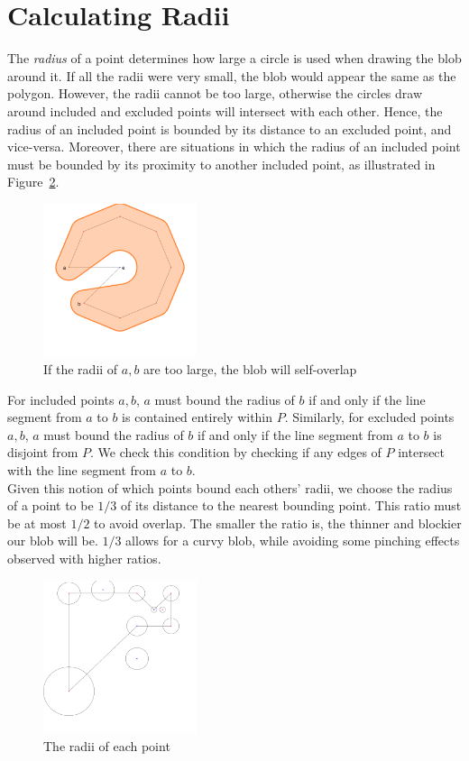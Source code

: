 \documentclass[paper=a4, fontsize=11pt]{scrartcl} %
\numberwithin{equation}{section} %
\numberwithin{figure}{section} %
\numberwithin{table}{section} %
\begin{document}
\section{Calculating Radii}
The \textit{radius} of a point determines how large a circle is used when
drawing the blob around it. If all the radii were very small, the blob would
appear the same as the polygon.  However, the radii cannot be too large,
otherwise the circles draw around included and excluded points will intersect
with each other. Hence, the radius of an included point is bounded by its
distance to an excluded point, and vice-versa. Moreover, there are situations in
which the radius of an included point must be bounded by its proximity to
another included point, as illustrated in Figure~\ref{fig:neck}. \\

\begin{figure}[h]
\includegraphics[width=0.4\textwidth]{torus_bitten}
\centering
\caption{If the radii of $a,b$ are too large, the blob will self-overlap}
\label{fig:neck}
\end{figure}

For included points $a,b$, $a$ must bound the radius of $b$ if and only if the
line segment from $a$ to $b$ is contained entirely within $P$. Similarly, for
excluded points $a,b$, $a$ must bound the radius of $b$ if and only if the line
segment from $a$ to $b$ is disjoint from $P$. We check this condition by
checking if any edges of $P$ intersect with the line segment from $a$ to $b$. \\

Given this notion of which points bound each others' radii, we choose the radius
of a point to be $1/3$ of its distance to the nearest bounding point. This
ratio must be at most $1/2$ to avoid overlap. The smaller the ratio is, the
thinner and blockier our blob will be. $1/3$ allows for a curvy blob, while
avoiding some pinching effects observed with higher ratios.

\begin{figure}[h]
\includegraphics[width=0.4\textwidth]{radii}
\centering
\caption{The radii of each point}
\label{fig:neck}
\end{figure}
\end{document}
